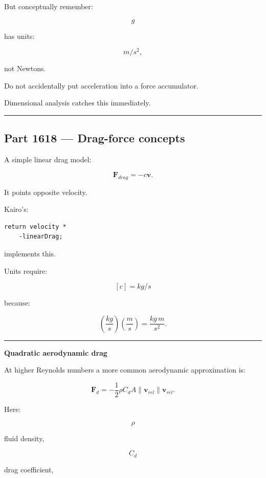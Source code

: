 But conceptually remember:

\[
g
\]

has units:

\[
m/s^2,
\]

not Newtons.

Do not accidentally put acceleration into a force accumulator.

Dimensional analysis catches this immediately.

\begin{center}\rule{0.5\linewidth}{0.5pt}\end{center}

\subsection{Part 1618 --- Drag-force concepts}\label{06-engine-ii-ch034-part-1618-drag-force-concepts}

\hypertarget{06-engine-ii-ch034-part-1618-drag-force-concepts}{}

A simple linear drag model:

\[
\boxed{
\mathbf{F}_{drag}
=
-c\mathbf{v}.
}
\]

It points opposite velocity.

Kairo's:

\begin{verbatim}
return velocity *
    -linearDrag;
\end{verbatim}

implements this.

Units require:

\[
[c]
=
kg/s
\]

because:

\[
\left(\frac{kg}{s}\right)
\left(\frac{m}{s}\right)
=
\frac{kg\,m}{s^2}.
\]

\begin{center}\rule{0.5\linewidth}{0.5pt}\end{center}

\textbf{Quadratic aerodynamic drag}

At higher Reynolds numbers a more common aerodynamic approximation is:

\[
\boxed{
\mathbf{F}_d
=
-\frac12
\rho C_d A
\|\mathbf{v}_{rel}\|
\mathbf{v}_{rel}.
}
\]

Here:

\[
\rho
\]

fluid density,

\[
C_d
\]

drag coefficient,

